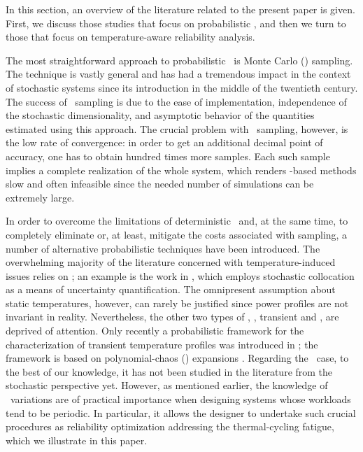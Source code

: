 In this section, an overview of the literature related to the present paper is given.
First, we discuss those studies that focus on probabilistic \ta, and then we turn to those that focus on temperature-aware reliability analysis.

The most straightforward approach to probabilistic \ta\ is Monte Carlo (\MC) sampling.
The technique is vastly general and has had a tremendous impact in the context of stochastic systems since its introduction in the middle of the twentieth century.
The success of \MC\ sampling is due to the ease of implementation, independence of the stochastic dimensionality, and asymptotic behavior of the quantities estimated using this approach.
The crucial problem with \MC\ sampling, however, is the low rate of convergence: in order to get an additional decimal point of accuracy, one has to obtain hundred times more samples.
Each such sample implies a complete realization of the whole system, which renders \MC-based methods slow and often infeasible since the needed number of simulations can be extremely large.

In order to overcome the limitations of deterministic \ta\ and, at the same time, to completely eliminate or, at least, mitigate the costs associated with  sampling, a number of alternative probabilistic techniques have been introduced.
The overwhelming majority of the literature concerned with temperature-induced issues relies on \sssta; an example is the work in \cite{lee2013}, which employs stochastic collocation \cite{maitre2010} as a means of uncertainty quantification.
The omnipresent assumption about static temperatures, however, can rarely be justified since power profiles are not invariant in reality.
Nevertheless, the other two types of \ta, \ie, transient and \DSS, are deprived of attention.
Only recently a probabilistic framework for the characterization of transient temperature profiles was introduced in \cite{ukhov2014}; the framework is based on polynomial-chaos (\PC) expansions \cite{maitre2010}.
Regarding the \DSS\ case, to the best of our knowledge, it has not been studied in the literature from the stochastic perspective yet.
However, as mentioned earlier, the knowledge of \DSS\ variations are of practical importance when designing systems whose workloads tend to be periodic.
In particular, it allows the designer to undertake such crucial procedures as reliability optimization addressing the thermal-cycling fatigue, which we illustrate in this paper.

